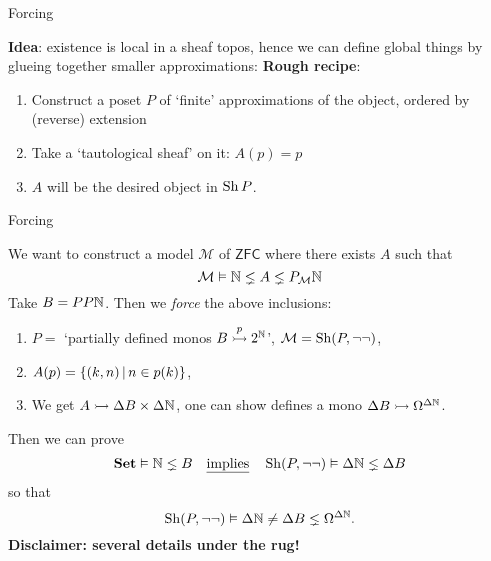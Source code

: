\begin{frame}{Forcing}


	\textbf{Idea}: existence is local in a sheaf topos, hence we can define global things by glueing together smaller approximations:
	\vfill
	\textbf{Rough recipe}:
	\begin{enumerate}
		\item Construct a poset $P$ of `finite' approximations of the object, ordered by (reverse) extension
		\item Take a `tautological sheaf' on it: $A(p) = p$
		\item $A$ will be the desired object in $\operatorname{Sh} P$.
	\end{enumerate}
	\vfill
\end{frame}

\begin{frame}{Forcing}
	\begin{example}
		We want to construct a model $\mathcal M$ of $\mathsf{ZFC}$ where there exists $A$ such that
		\begin{equation*}
			\mathcal M \vDash \mathbb{N} \lneq A \lneq P_{\mathcal M} \mathbb{N}
		\end{equation*}
		Take $B = PP\mathbb{N}$. Then we \emph{force} the above inclusions:
		\begin{enumerate}
			\item $P = $ `partially defined monos $B \overset{p}{\rightarrowtail} 2^{\mathbb{N}}$', $\mathcal M = \operatorname{Sh}(P, \neg\neg)$,
			\item $A(p) = \{(k, n) \,|\, n \in p(k)\}$,
			\item We get $A \rightarrowtail \Delta B \times \Delta \mathbb{N}$, one can show defines a mono $\Delta B \rightarrowtail \Omega^{\Delta \mathbb{N}}$.
		\end{enumerate}
		Then we can prove
		\begin{equation*}
			\mathbf{Set} \vDash \mathbb{N} \lneq B \quad\text{\underline{implies}}\quad \operatorname{Sh}(P, \neg\neg) \vDash \Delta\mathbb{N} \lneq \Delta B
		\end{equation*}
		so that
		\begin{equation*}
			\operatorname{Sh}(P, \neg\neg) \vDash \Delta \mathbb{N} \neq \Delta B \lneq \Omega^{\Delta \mathbb{N}}.
		\end{equation*}
		{\bfseries\color{colornote}Disclaimer: several details under the rug!}
	\end{example}
\end{frame}

